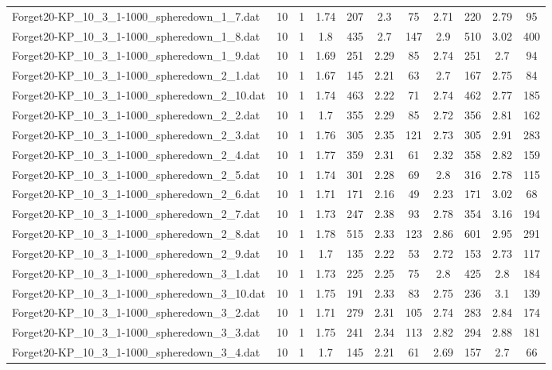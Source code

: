 \begin{table}[!ht]
\begin{tabular}{lcccccccccc}
Forget20-KP\_10\_3\_1-1000\_spheredown\_1\_7.dat & 10 & 1 & 1.74 & 207 & 2.3 & 75 & 2.71 & 220 & 2.79 & 95 \\
Forget20-KP\_10\_3\_1-1000\_spheredown\_1\_8.dat & 10 & 1 & 1.8 & 435 & 2.7 & 147 & 2.9 & 510 & 3.02 & 400 \\
Forget20-KP\_10\_3\_1-1000\_spheredown\_1\_9.dat & 10 & 1 & 1.69 & 251 & 2.29 & 85 & 2.74 & 251 & 2.7 & 94 \\
Forget20-KP\_10\_3\_1-1000\_spheredown\_2\_1.dat & 10 & 1 & 1.67 & 145 & 2.21 & 63 & 2.7 & 167 & 2.75 & 84 \\
Forget20-KP\_10\_3\_1-1000\_spheredown\_2\_10.dat & 10 & 1 & 1.74 & 463 & 2.22 & 71 & 2.74 & 462 & 2.77 & 185 \\
Forget20-KP\_10\_3\_1-1000\_spheredown\_2\_2.dat & 10 & 1 & 1.7 & 355 & 2.29 & 85 & 2.72 & 356 & 2.81 & 162 \\
Forget20-KP\_10\_3\_1-1000\_spheredown\_2\_3.dat & 10 & 1 & 1.76 & 305 & 2.35 & 121 & 2.73 & 305 & 2.91 & 283 \\
Forget20-KP\_10\_3\_1-1000\_spheredown\_2\_4.dat & 10 & 1 & 1.77 & 359 & 2.31 & 61 & 2.32 & 358 & 2.82 & 159 \\
Forget20-KP\_10\_3\_1-1000\_spheredown\_2\_5.dat & 10 & 1 & 1.74 & 301 & 2.28 & 69 & 2.8 & 316 & 2.78 & 115 \\
Forget20-KP\_10\_3\_1-1000\_spheredown\_2\_6.dat & 10 & 1 & 1.71 & 171 & 2.16 & 49 & 2.23 & 171 & 3.02 & 68 \\
Forget20-KP\_10\_3\_1-1000\_spheredown\_2\_7.dat & 10 & 1 & 1.73 & 247 & 2.38 & 93 & 2.78 & 354 & 3.16 & 194 \\
Forget20-KP\_10\_3\_1-1000\_spheredown\_2\_8.dat & 10 & 1 & 1.78 & 515 & 2.33 & 123 & 2.86 & 601 & 2.95 & 291 \\
Forget20-KP\_10\_3\_1-1000\_spheredown\_2\_9.dat & 10 & 1 & 1.7 & 135 & 2.22 & 53 & 2.72 & 153 & 2.73 & 117 \\
Forget20-KP\_10\_3\_1-1000\_spheredown\_3\_1.dat & 10 & 1 & 1.73 & 225 & 2.25 & 75 & 2.8 & 425 & 2.8 & 184 \\
Forget20-KP\_10\_3\_1-1000\_spheredown\_3\_10.dat & 10 & 1 & 1.75 & 191 & 2.33 & 83 & 2.75 & 236 & 3.1 & 139 \\
Forget20-KP\_10\_3\_1-1000\_spheredown\_3\_2.dat & 10 & 1 & 1.71 & 279 & 2.31 & 105 & 2.74 & 283 & 2.84 & 174 \\
Forget20-KP\_10\_3\_1-1000\_spheredown\_3\_3.dat & 10 & 1 & 1.75 & 241 & 2.34 & 113 & 2.82 & 294 & 2.88 & 181 \\
Forget20-KP\_10\_3\_1-1000\_spheredown\_3\_4.dat & 10 & 1 & 1.7 & 145 & 2.21 & 61 & 2.69 & 157 & 2.7 & 66 \\

\end{tabular}
\end{table}
